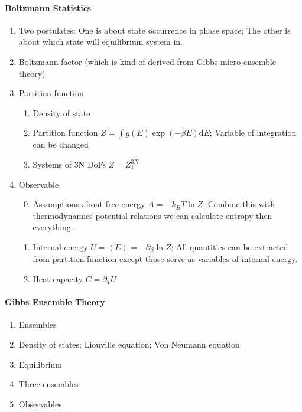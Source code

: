 \documentclass[letterpaper,10pt,english]{sphinxmanual}
\newcommand{\avg}[1]{\left< #1 \right>}
\begin{document}
\paragraph{Boltzmann Statistics}
\label{equilibrium/summary1:boltzmann-statistics}\begin{enumerate}
\item {} 
Two postulates: One is about state occurrence in phase space; The other is about which state will equilibrium system in.

\item {} 
Boltzmann factor (which is kind of derived from Gibbs micro-ensemble theory)

\item {} 
Partition function
\begin{enumerate}
\item {} 
Density of state

\item {} 
Partition function $Z = \int g(E) \exp(-\beta E) \mathrm dE$; Variable of integration can be changed

\item {} 
Systems of 3N DoFs $Z = Z_1^{3N}$

\end{enumerate}

\item {} 
Observable
\begin{enumerate}
\setcounter{enumi}{-1}
\item {} 
Assumptions about free energy $A = - k_B T\ln Z$; Combine this with thermodynamics potential relations we can calculate entropy then everything.

\item {} 
Internal energy $U = \avg{E} = - \partial_\beta \ln Z$; All quantities can be extracted from partition function except those serve as variables of internal energy.

\item {} 
Heat capacity $C = \partial_T U$

\end{enumerate}

\end{enumerate}


\paragraph{Gibbs Ensemble Theory}
\label{equilibrium/summary1:gibbs-ensemble-theory}\begin{enumerate}
\item {} 
Ensembles

\item {} 
Density of states; Liouville equation; Von Neumann equation

\item {} 
Equilibrium

\item {} 
Three ensembles

\item {} 
Observables

\end{enumerate}
\end{document}
